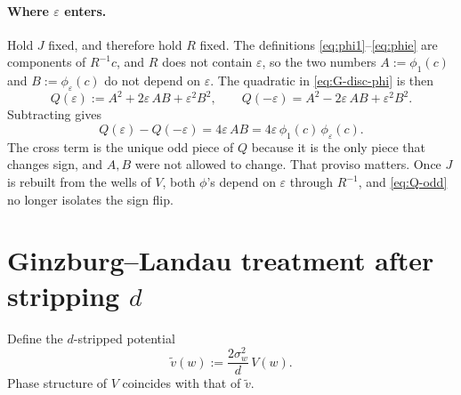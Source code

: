 \documentclass[11pt,a4paper]{article}
\begin{document}
\paragraph{Where $\varepsilon$ enters.}
Hold $J$ fixed, and therefore hold $R$ fixed.
The definitions \eqref{eq:phi1}--\eqref{eq:phie} are components of $R^{-1}c$,
and $R$ does not contain $\varepsilon$, so the two numbers
$A:=\phi_1(c)$ and $B:=\phi_\varepsilon(c)$ do not depend on $\varepsilon$.
The quadratic in \eqref{eq:G-disc-phi} is then
\begin{equation}
  Q(\varepsilon)
  :=
  A^2
  +
  2\varepsilon\, A B
  +
  \varepsilon^2 B^2,
  \qquad
  Q(-\varepsilon)
  =
  A^2
  -
  2\varepsilon\, A B
  +
  \varepsilon^2 B^2.
\end{equation}
Subtracting gives
\begin{equation}
  Q(\varepsilon)-Q(-\varepsilon)
  =
  4\varepsilon\, A B
  =
  4\varepsilon\,
  \phi_1(c)\,\phi_\varepsilon(c).
  \label{eq:Q-odd}
\end{equation}
The cross term is the unique odd piece of $Q$ because it is the only piece that
changes sign, and $A,B$ were not allowed to change.
That proviso matters.
Once $J$ is rebuilt from the wells of $V$, both $\phi$'s depend on $\varepsilon$
through $R^{-1}$, and \eqref{eq:Q-odd} no longer isolates the sign flip.

\section{Ginzburg--Landau treatment after stripping $d$}

Define the $d$-stripped potential
\begin{equation}
  \tilde v(w)
  :=
  \frac{2\sigma_w^2}{d}\, V(w).
  \label{eq:vtilde}
\end{equation}
Phase structure of $V$ coincides with that of $\tilde v$.
\end{document}
